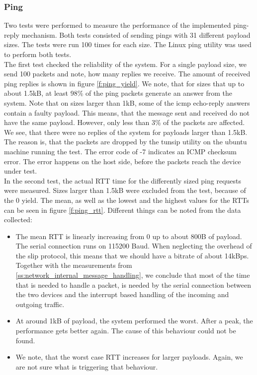 \subsubsection{Ping \label{ss:network_performance_ping}}
Two tests were performed to measure the performance of the implemented ping-reply mechanism. Both tests consisted of sending pings with 31 different payload sizes. The tests were run 100 times for each size. The Linux ping utility was used to perform both tests.\\
The first test checked the reliability of the system. For a single payload size, we send 100 packets and note, how many replies we receive. The amount of received ping replies is shown in figure \ref{f:ping_yield}. We note, that for sizes that up to about 1.5kB, at least 98\% of the ping packets generate an answer from the system. Note that on sizes larger than 1kB, some of the icmp echo-reply answers contain a faulty payload. This means, that the message sent and received do not have the same payload. However, only less than 3\% of the packets are affected. We see, that there were no replies of the system for payloads larger than 1.5kB. The reason is, that the packets are dropped by the tunsip utility on the ubuntu machine running the test. The error code of -7 indicates an ICMP checksum error. The error happens on the host side, before the packets reach the device under test.\\
In the second test, the actual RTT time for the differently sized ping requests were measured. Sizes larger than 1.5kB were excluded from the test, because of the 0 yield. The mean, as well as the lowest and the highest values for the RTTs can be seen in figure \ref{f:ping_rtt}. Different things can be noted from the data collected: 
\begin{itemize}
	\item The mean RTT is linearly increasing from 0 up to about 800B of payload. The serial connection runs on 115200 Baud. When neglecting the overhead of the slip protocol, this means that we should have a bitrate of about 14kBps. Together with the measurements from \ref{ss:network_internal_message_handling}, we conclude that most of the time that is needed to handle a packet, is needed by the serial connection between the two devices and the interrupt based handling of the incoming and outgoing traffic.
	\item At around 1kB of payload, the system performed the worst. After a peak, the performance gets better again. The cause of this behaviour could not be found.
	\item We note, that the worst case RTT increases for larger payloads. Again, we are not sure what is triggering that behaviour.
\end{itemize}

